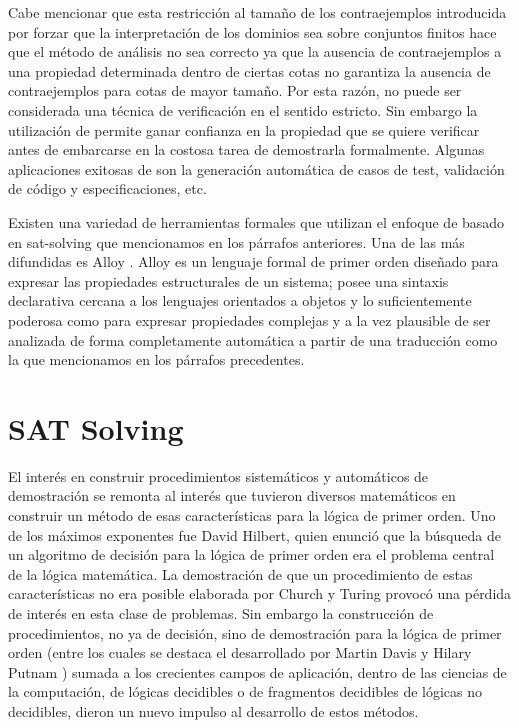 Cabe mencionar que esta restricción al tamaño de los contraejemplos
introducida por forzar que la interpretación de los dominios sea sobre
conjuntos finitos hace que el método de análisis no sea correcto ya que la
ausencia de contraejemplos a una propiedad determinada dentro de ciertas cotas
no garantiza la ausencia de contraejemplos para cotas de mayor tamaño. Por
esta razón, \bmc no puede ser considerada una técnica de verificación en el
sentido estricto. Sin embargo la utilización de \bmc permite ganar confianza
en la propiedad que se quiere verificar antes de embarcarse en la costosa
tarea de demostrarla formalmente. Algunas aplicaciones exitosas de \bmc son la
generación automática de casos de test, validación de código y
especificaciones, etc.

Existen una variedad de herramientas formales que utilizan el enfoque de \bmc
basado en sat-solving que mencionamos en los párrafos anteriores. Una de las
más difundidas es Alloy \cite{jackson:acmtosem-11_2}. Alloy es un lenguaje
formal de primer orden diseñado para expresar las propiedades estructurales de
un sistema; posee una sintaxis declarativa cercana a los lenguajes orientados
a objetos y lo suficientemente poderosa como para expresar propiedades
complejas y a la vez plausible de ser analizada de forma completamente
automática a partir de una traducción como la que mencionamos en los párrafos
precedentes.


\section{SAT Solving}

El interés en construir procedimientos sistemáticos y automáticos de
demostración se remonta al interés que tuvieron diversos matemáticos en
construir un método de esas características para la lógica de primer orden.
Uno de los máximos exponentes fue David Hilbert, quien enunció que la búsqueda
de un algoritmo de decisión para la lógica de primer orden era el problema
central de la lógica matemática. La demostración de que un procedimiento de estas características no
era posible elaborada por Church y Turing provocó una pérdida de interés en
esta clase de problemas. Sin embargo la construcción de procedimientos, no ya
de decisión, sino de demostración para la lógica de primer orden (entre los
cuales se destaca el desarrollado por Martin Davis y Hilary Putnam
\cite{Davis:1960:CPQ:321033.321034}) sumada a los crecientes campos de
aplicación, dentro de las ciencias de la computación, de lógicas decidibles o
de fragmentos decidibles de lógicas no decidibles, dieron un nuevo impulso al
desarrollo de estos métodos.

